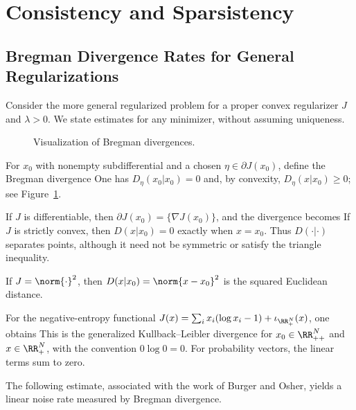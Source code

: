 \section{Consistency and Sparsistency}

                                        
\subsection{Bregman Divergence Rates for General Regularizations}

Consider the more general regularized problem
for a proper convex regularizer $J$ and $\lambda>0$. We state estimates for any minimizer, without assuming uniqueness.

\begin{figure}[tbp]
\centering
{}
\caption{Visualization of Bregman divergences.}
\label{fig-bregman}
\end{figure}

For $x_0$ with nonempty subdifferential and a chosen $\eta \in \partial J(x_0)$, define the Bregman divergence
One has $D_\eta(x_0|x_0)=0$ and, by convexity, $D_\eta(x|x_0)\geq0$; see Figure~\ref{fig-bregman}.

If $J$ is differentiable, then $\partial J(x_0)=\{\nabla J(x_0)\}$, and the divergence becomes
If $J$ is strictly convex, then $D(x|x_0)=0$ exactly when $x=x_0$. Thus $D(\cdot|\cdot)$ separates points, although it need not be symmetric or satisfy the triangle inequality.

If $J=\norm{\cdot}^2$, then $D(x|x_0) = \norm{x-x_0}^2$ is the squared Euclidean distance.
 
For the negative-entropy functional $J(x)=\sum_i x_i(\log x_i-1)+\iota_{\RR_+^N}(x)$, one obtains
This is the generalized Kullback--Leibler divergence for $x_0\in\RR_{++}^N$ and $x\in\RR_+^N$, with the convention $0\log0=0$. For probability vectors, the linear terms sum to zero.

The following estimate, associated with the work of Burger and Osher, yields a linear noise rate measured by Bregman divergence.

